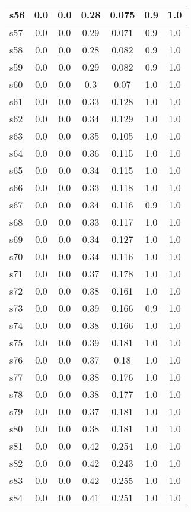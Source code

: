 \documentclass{article}
\begin{document}
\begin{tabular}{|l|c|c|c|c|c|c|}
\hline
s56 &0.0 & 0.0 & 0.28 & 0.075 & 0.9 & 1.0\\
\hline
s57 &0.0 & 0.0 & 0.29 & 0.071 & 0.9 & 1.0\\
\hline
s58 &0.0 & 0.0 & 0.28 & 0.082 & 0.9 & 1.0\\
\hline
s59 &0.0 & 0.0 & 0.29 & 0.082 & 0.9 & 1.0\\
\hline
s60 &0.0 & 0.0 & 0.3 & 0.07 & 1.0 & 1.0\\
\hline
s61 &0.0 & 0.0 & 0.33 & 0.128 & 1.0 & 1.0\\
\hline
s62 &0.0 & 0.0 & 0.34 & 0.129 & 1.0 & 1.0\\
\hline
s63 &0.0 & 0.0 & 0.35 & 0.105 & 1.0 & 1.0\\
\hline
s64 &0.0 & 0.0 & 0.36 & 0.115 & 1.0 & 1.0\\
\hline
s65 &0.0 & 0.0 & 0.34 & 0.115 & 1.0 & 1.0\\
\hline
s66 &0.0 & 0.0 & 0.33 & 0.118 & 1.0 & 1.0\\
\hline
s67 &0.0 & 0.0 & 0.34 & 0.116 & 0.9 & 1.0\\
\hline
s68 &0.0 & 0.0 & 0.33 & 0.117 & 1.0 & 1.0\\
\hline
s69 &0.0 & 0.0 & 0.34 & 0.127 & 1.0 & 1.0\\
\hline
s70 &0.0 & 0.0 & 0.34 & 0.116 & 1.0 & 1.0\\
\hline
s71 &0.0 & 0.0 & 0.37 & 0.178 & 1.0 & 1.0\\
\hline
s72 &0.0 & 0.0 & 0.38 & 0.161 & 1.0 & 1.0\\
\hline
s73 &0.0 & 0.0 & 0.39 & 0.166 & 0.9 & 1.0\\
\hline
s74 &0.0 & 0.0 & 0.38 & 0.166 & 1.0 & 1.0\\
\hline
s75 &0.0 & 0.0 & 0.39 & 0.181 & 1.0 & 1.0\\
\hline
s76 &0.0 & 0.0 & 0.37 & 0.18 & 1.0 & 1.0\\
\hline
s77 &0.0 & 0.0 & 0.38 & 0.176 & 1.0 & 1.0\\
\hline
s78 &0.0 & 0.0 & 0.38 & 0.177 & 1.0 & 1.0\\
\hline
s79 &0.0 & 0.0 & 0.37 & 0.181 & 1.0 & 1.0\\
\hline
s80 &0.0 & 0.0 & 0.38 & 0.181 & 1.0 & 1.0\\
\hline
s81 &0.0 & 0.0 & 0.42 & 0.254 & 1.0 & 1.0\\
\hline
s82 &0.0 & 0.0 & 0.42 & 0.243 & 1.0 & 1.0\\
\hline
s83 &0.0 & 0.0 & 0.42 & 0.255 & 1.0 & 1.0\\
\hline
s84 &0.0 & 0.0 & 0.41 & 0.251 & 1.0 & 1.0\\

\end{tabular}
\end{document}
